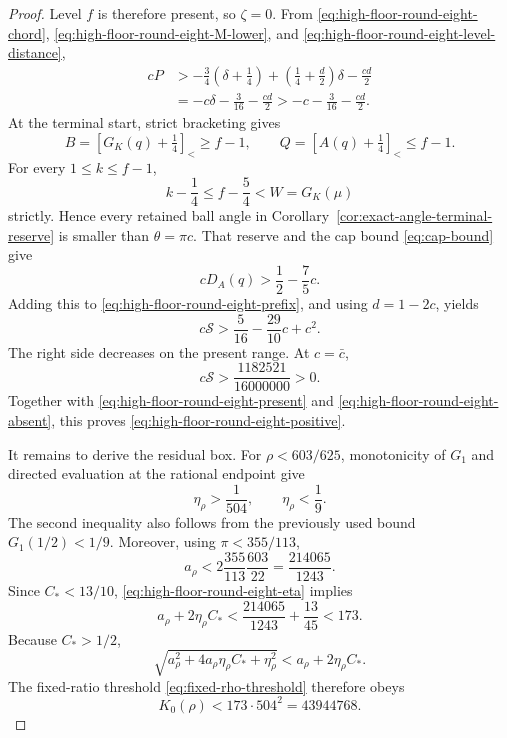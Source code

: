 \documentclass[11pt]{article}
\theoremstyle{remark}
\newcommand{\sbr}[1]{[#1]_{<}}
\begin{document}
\begin{proof}
Level $f$ is therefore present, so $\zeta=0$.  From
\eqref{eq:high-floor-round-eight-chord},
\eqref{eq:high-floor-round-eight-M-lower}, and
\eqref{eq:high-floor-round-eight-level-distance},
\begin{equation}
\begin{aligned}
 cP
 &>-\frac34\left(\delta+\frac14\right)
   +\left(\frac14+\frac d2\right)\delta
   -\frac{cd}{2}\\
 &=-c\delta-\frac3{16}-\frac{cd}{2}
 >-c-\frac3{16}-\frac{cd}{2}.
\end{aligned}
 \label{eq:high-floor-round-eight-prefix}
\end{equation}
At the terminal start, strict bracketing gives
\[
 B=\sbr{G_K(q)+\tfrac14}\geq f-1,\qquad
 Q=\sbr{A(q)+\tfrac14}\leq f-1.
\]
For every $1\leq k\leq f-1$,
\[
 k-\frac14\leq f-\frac54<W=G_K(\mu)
\]
strictly.  Hence every retained ball angle in
Corollary~\ref{cor:exact-angle-terminal-reserve} is smaller than
$\theta=\pi c$.  That reserve and the cap bound \eqref{eq:cap-bound}
give
\begin{equation}
 cD_A(q)>\frac12-\frac75c.
 \label{eq:high-floor-round-eight-terminal}
\end{equation}
Adding this to \eqref{eq:high-floor-round-eight-prefix}, and using
$d=1-2c$, yields
\[
 c\mathcal S>\frac5{16}-\frac{29}{10}c+c^2.
\]
The right side decreases on the present range.  At $c=\bar c$,
\begin{equation}
 \boxed{
 c\mathcal S>\frac{1182521}{16000000}>0.}
 \label{eq:high-floor-round-eight-final}
\end{equation}
Together with \eqref{eq:high-floor-round-eight-present} and
\eqref{eq:high-floor-round-eight-absent}, this proves
\eqref{eq:high-floor-round-eight-positive}.

It remains to derive the residual box.  For
$\rho<603/625$, monotonicity of $G_1$ and directed evaluation at the
rational endpoint give
\begin{equation}
 \eta_\rho>\frac1{504},\qquad \eta_\rho<\frac19.
 \label{eq:high-floor-round-eight-eta}
\end{equation}
The second inequality also follows from the previously used bound
$G_1(1/2)<1/9$.  Moreover, using $\pi<355/113$,
\[
 a_\rho<2\frac{355}{113}\frac{603}{22}
 =\frac{214065}{1243}.
\]
Since $C_*<13/10$, \eqref{eq:high-floor-round-eight-eta} implies
\begin{equation}
 a_\rho+2\eta_\rho C_*
 <\frac{214065}{1243}+\frac{13}{45}<173.
 \label{eq:high-floor-round-eight-numerator}
\end{equation}
Because $C_*>1/2$,
\[
 \sqrt{a_\rho^2+4a_\rho\eta_\rho C_*+\eta_\rho^2}
 <a_\rho+2\eta_\rho C_*.
\]
The fixed-ratio threshold \eqref{eq:fixed-rho-threshold} therefore obeys
\begin{equation}
 \boxed{
 K_0(\rho)<173\mathbin{\cdot}504^2=43944768.}
 \label{eq:high-floor-round-eight-cutoff}
\end{equation}


\end{proof}
\end{document}
